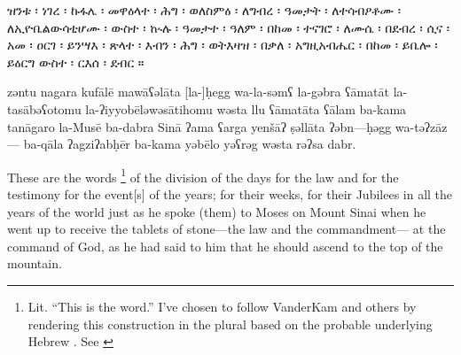 \begin{ethiopictext}
        ዝንቱ ፡ ነገረ ፡ ኩፋሌ ፡
        መዋዕላተ ፡ ሕግ ፡ ወለስምዕ ፡
        ለግብረ ፡ ዓመታት ፡ ለተሳብዖቶሙ ፡ 
        ለኢዮቤልውሳቲሆሙ ፡ ውስተ ፡ ኲሉ ፡ ዓመታተ ፡ ዓለም ፡
        በከመ ፡ ተናገሮ ፡ ለሙሴ ፡ በደብረ ፡ ሲና ፡
        አመ ፡ ዐርገ ፡ ይንሣእ ፡ ጽላተ ፡ እብን ፡ ሕግ ፡ ወትእዛዝ ፡ 
        በቃለ ፡ አግዚአብሔር ፡ በከመ ፡ ይቤሎ ፡ ይዕርግ ውስተ ፡ ርእሰ ፡ ደብር ።
\end{ethiopictext}

\begin{transliteration}
        zəntu nagara kufālē
        mawāʕəlāta [la-]ḥegg wa-la-səmʕ
        la-gəbra ʕāmatāt la-tasābəʕotomu
        la-ʔiyyobēləwəsātihomu wəsta llu ʕāmatāta ʕālam
        ba-kama tanāgaro la-Musē ba-dabra Sinā
        ʔama ʕarga yenšāʔ ṣəllāta ʔəbn---ḥəgg wa-təʔzāz---%
        ba-qāla ʔagziʔabḥēr ba-kama yəbēlo yəʕrəg wəsta rəʔsa dabr.
\end{transliteration}

\begin{translation}
        These are the words%
        \footnote{Lit. ``This is the word.'' I've chosen to follow VanderKam and others by rendering this construction in the plural based on the probable underlying Hebrew . See \cite[125]{vanderkam2018}}
        of the division 
        of the days for the law and for the testimony
        for the event[s] of the years; for their weeks,
        for their Jubilees in all the years of the world
        just as he spoke (them) to Moses on Mount Sinai 
        when he went up to receive the tablets of stone---the law and the commandment---%
        at the command of God, as he had said to him 
        that he should ascend to the top of the mountain.
\end{translation}